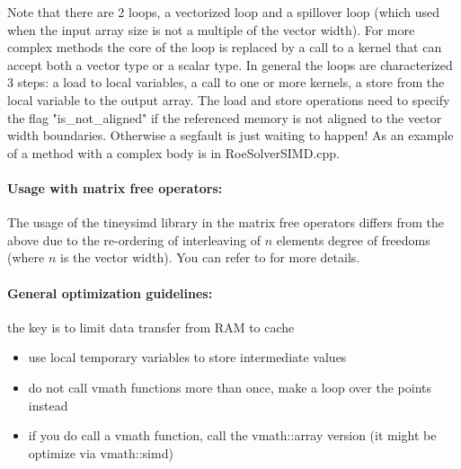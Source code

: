

Note that there are 2 loops, a vectorized loop and a spillover loop (which used when the input array size is not a multiple of the vector width).
For more complex methods the core of the loop is replaced by a call to a kernel that can accept both a vector type or a scalar type.
In general the loops are characterized 3 steps: a load to local variables, a call to one or more kernels, a store from the local variable to the output array.
The load and store operations need to specify the flag "is_not_aligned" if the referenced memory is not aligned to the vector width boundaries. Otherwise a segfault is just waiting to happen!
As an example of a method with a complex body is in RoeSolverSIMD.cpp.

\paragraph{Usage with matrix free operators: }

The usage of the tineysimd library in the matrix free operators differs from the above due to the re-ordering of interleaving of $n$ elements degree of freedoms (where $n$ is the vector width).
You can refer to \cite{dave} for more details.

\paragraph{General optimization guidelines:} the key is to limit data transfer from RAM to cache
\begin{itemize}
\item use local temporary variables to store intermediate values
\item do not call vmath functions more than once, make a loop over the points instead
\item if you do call a vmath function, call the vmath::array version (it might be optimize via vmath::simd)

\end{itemize}
